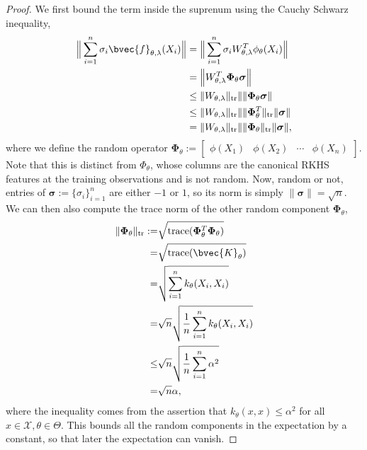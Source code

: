 \documentclass[runningheads, envcountsame, a4paper]{llncs}
\begin{document}
\begin{proof}
				We first bound the term inside the suprenum using the Cauchy Schwarz inequality,
				\begin{equation}
				\begin{aligned}
					\Big\| \sum_{i = 1}^{n} \sigma_{i}\bvec{f}_{\theta, \lambda}(X_{i}) \Big\| &= \Big\| \sum_{i = 1}^{n} \sigma_{i} W_{\theta, \lambda}^{T} \phi_{\theta}(X_{i}) \Big\| \\
					&= \Big\| W_{\theta, \lambda}^{T} \bm{\Phi}_{\theta} \bm{\sigma} \Big\| \\
					&\leq \| W_{\theta, \lambda} \|_{\mathrm{tr}} \| \| \bm{\Phi}_{\theta} \bm{\sigma} \| \\
					&\leq \| W_{\theta, \lambda} \|_{\mathrm{tr}} \| \| \bm{\Phi}_{\theta}^{T} \|_{\mathrm{tr}} \| \bm{\sigma} \| \\
					&= \| W_{\theta, \lambda} \|_{\mathrm{tr}} \| \| \bm{\Phi}_{\theta} \|_{\mathrm{tr}} \| \bm{\sigma} \|,
				\end{aligned}
				\end{equation}
				where we define the random operator $\bm{\Phi}_{\theta} := \begin{bmatrix} \phi(X_{1}) & \phi(X_{2}) & \cdots & \phi(X_{n}) \end{bmatrix}$. Note that this is distinct from $\Phi_{\theta}$, whose columns are the canonical \gls{RKHS} features at the training observations and is not random. Now, random or not, entries of $\bm{\sigma} := \{\sigma_{i}\}_{i = 1}^{n}$ are either $-1$ or $1$, so its norm is simply $\| \bm{\sigma} \| = \sqrt{n}$. We can then also compute the trace norm of the other random component $\bm{\Phi}_{\theta}$,
				\begin{equation}
				\begin{aligned}
					\| \bm{\Phi}_{\theta} \|_{\mathrm{tr}} :=& \sqrt{\mathrm{trace}(\bm{\Phi}_{\theta}^{T} \bm{\Phi}_{\theta})} \\
					=& \sqrt{\mathrm{trace}(\bvec{K}_{\theta})} \\
					=& \sqrt{\sum_{i = 1}^{n} k_{\theta}(X_{i}, X_{i})} \\
					=& \sqrt{n} \sqrt{ \frac{1}{n} \sum_{i = 1}^{n} k_{\theta}(X_{i}, X_{i})} \\
					\leq& \sqrt{n} \sqrt{ \frac{1}{n} \sum_{i = 1}^{n} \alpha^{2}} \\
					=& \sqrt{n} \alpha,
				\end{aligned}
				\end{equation}
				where the inequality comes from the assertion that $k_{\theta}(x, x) \leq \alpha^{2}$ for all $x \in \mathcal{X}, \theta \in \Theta$. This bounds all the random components in the expectation by a constant, so that later the expectation can vanish. 
				

\end{proof}
\end{document}
